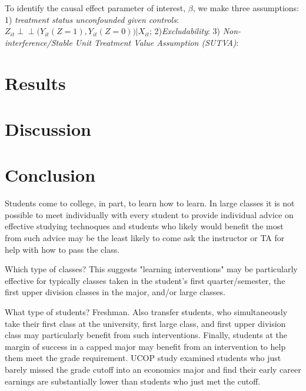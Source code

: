 \documentclass[12pt]{article}
\begin{document}
To identify the causal effect parameter of interest, $\beta$, we make three assumptions: 1) \textit{treatment status unconfounded given controls}: $Z_{it} \perp \!\!\! \perp \Big(Y_{it}(Z=1), Y_{it}(Z=0)\Big) \Big| X_{it}$; 2)\textit{Excludability}: 3) \textit{Non-interference/Stable Unit Treatment Value Assumption (SUTVA)}: 




\section{Results} \label{results}


\section{Discussion} \label{discussion}


\section{Conclusion} \label{conclusion}
Students come to college, in part, to learn how to learn.  In large classes it is not possible to meet individually with every student to provide individual advice on effective studying technoques and students who likely would benefit the most from such advice may be the least likely to come ask the instructor or TA for help with how to pass the class.  

Which type of classes?  This suggests "learning interventions" may be particularly effective for typically classes taken in the student's first quarter/semester, the first upper division classes in the major, and/or large classes. 

What type of students? Freshman.  Also transfer students, who simultaneously take their first class at the university, first large class, and first upper division class may particularly benefit from such interventions.  Finally, students at the margin of success in a capped major may benefit from an intervention to help them meet the grade requirement.  UCOP study examined students who just barely missed the grade cutoff into an economics major and find their early career earnings are substantially lower than students who just met the cutoff.
\end{document}
